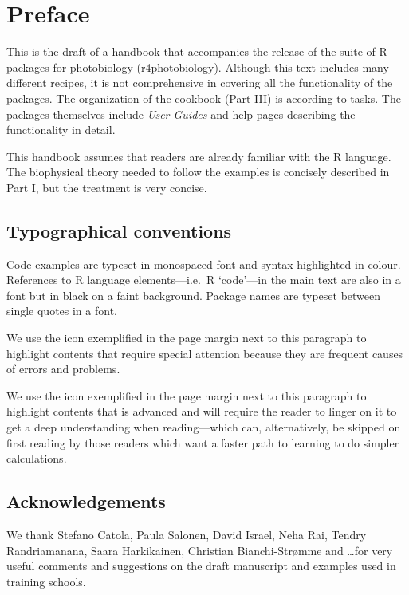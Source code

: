 \chapter{Preface}

This is the draft of a handbook that accompanies the release of the suite of R packages for photobiology (\textsf{r4photobiology}). Although this text includes many different recipes, it is not comprehensive in covering all the functionality of the packages. The organization of the cookbook (Part III) is according to tasks. The packages themselves include \emph{User Guides} and help pages describing the functionality in detail.

This handbook assumes that readers are already familiar with the R language. The biophysical theory needed to follow the examples is concisely described in Part I, but the treatment is very concise.

\section{Typographical conventions}

Code examples are typeset in monospaced font and syntax highlighted in colour. References to R language elements---i.e.\ R `code'---in the main text are also in a  font but in black on a faint background. Package names are typeset between single quotes in a  font.

We\Attention{} use the icon exemplified in the page margin next to this paragraph to highlight contents that require special attention because they are frequent causes of errors and problems.

We\Advanced{} use the icon exemplified in the page margin next to this paragraph to highlight contents that is advanced and will require the reader to linger on it to get a deep understanding when reading---which can, alternatively, be skipped on first reading by those readers which want a faster path to learning to do simpler calculations.

\section{Acknowledgements}

We thank Stefano Catola, Paula Salonen, David Israel, Neha Rai, Tendry Randriamanana, Saara Harkikainen, Christian Bianchi-Str{\o}mme and \ldots for very useful comments and suggestions on the draft manuscript and examples used in training schools.
